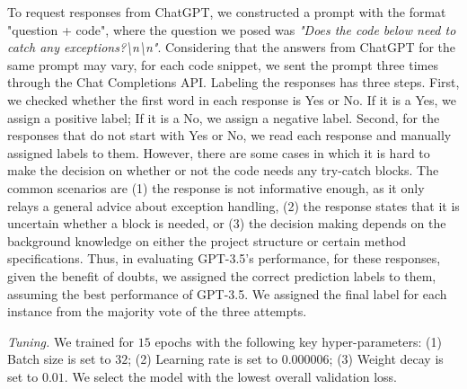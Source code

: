 To request responses from ChatGPT, we constructed a prompt with the format
"question + code", where the question we posed was {\em "Does the code below
need to catch any exceptions?\textbackslash n\textbackslash n"}.
Considering that the answers from ChatGPT for the same prompt may
vary, for each code snippet, we sent the prompt three times through
the Chat Completions API.
Labeling the responses has three steps. First, we checked whether the
first word in each response is Yes or No. If it is a Yes, we assign a
positive label; If it is a No, we assign a negative label. Second, for
the responses that do not start with Yes or No, we read each response
and manually assigned labels to them. However, there are some cases in
which it is hard to make the decision on whether or not the code needs
any try-catch blocks. The common scenarios are (1) the response is not
informative enough, as it only relays a general advice about exception
handling, (2) the response states that it is uncertain whether a
 block is needed, or (3) the decision making depends on the
background knowledge on either the project structure or certain method
specifications. Thus, in evaluating GPT-3.5's performance, for
these responses, given the benefit of doubts, we assigned the correct
prediction labels to them, assuming the best performance of GPT-3.5.
We assigned the final label for each instance from the majority
vote of the three attempts.



{\em Tuning.} We trained {\tool} for $15$ epochs with the following key hyper-parameters: (1) Batch size is set to $32$; (2) Learning rate is set to $0.000006$; (3) Weight decay is set to $0.01$. We select the model with the lowest overall validation loss.

